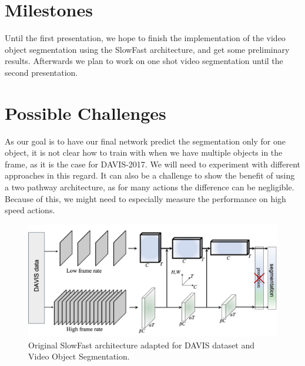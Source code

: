 \documentclass[conference]{IEEEtran}
\begin{document}
\section{Milestones}
Until the first presentation, we hope to finish the implementation of the video object segmentation using the SlowFast architecture, and get some preliminary results. Afterwards we plan to work on one shot video segmentation until the second presentation.
\section{Possible Challenges}
As our goal is to have our final network predict the segmentation only for one object, it is not clear how to train with when we have multiple objects in the frame, as it is the case for DAVIS-2017. We will need to experiment with different approaches in this regard. It can also be a challenge to show the benefit of using a two pathway architecture, as for many actions the difference can be negligible. Because of this, we might need to especially measure the performance on high speed actions.


\begin{figure}
	\centering
	\includegraphics[width=1.8\columnwidth]{SlowFastAdapted.jpg}
	\caption{Original SlowFast architecture adapted for DAVIS dataset and Video Object Segmentation.}
	\label{fig:slowfastadapted}
\end{figure}
\newpage



\end{document}
